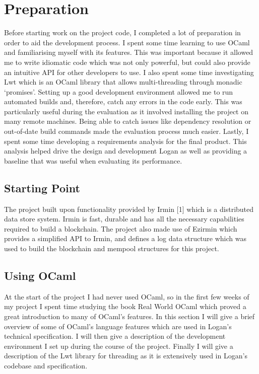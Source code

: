 \documentclass[12pt,a4paper,twoside,openright]{report}
\begin{document}
	\chapter{Preparation}
	Before starting work on the project code, I completed a lot of preparation in order to aid the development process.
	I spent some time learning to use OCaml and familiarising myself with its features.
	This was important because it allowed me to write idiomatic code which was not only powerful, but could also provide an intuitive API for other developers to use.
	I also spent some time investigating Lwt which is an OCaml library that allows multi-threading through monadic `promises'.
	Setting up a good development environment allowed me to run automated builds and, therefore, catch any errors in the code early.
	This was particularly useful during the evaluation as it involved installing the project on many remote machines.
	Being able to catch issues like dependency resolution or out-of-date build commands made the evaluation process much easier.
	Lastly, I spent some time developing a requirements analysis for the final product. 
	This analysis helped drive the design and development Logan as well as providing a baseline that was useful when evaluating its performance.

	\section{Starting Point}
	The project built upon functionality provided by Irmin [1] which is a distributed data store system. Irmin is fast, durable and has all the necessary capabilities required to build a blockchain.
	The project also made use of Ezirmin \cite{Ezirmin} which provides a simplified API to Irmin, and defines a log data structure which was used to build the blockchain and mempool structures for this project.

	\section{Using OCaml}
	At the start of the project I had never used OCaml, so in the first few weeks of my project I spent time studying the book Real World OCaml \cite{RealWorldOCaml} which proved a great introduction to many of OCaml's features.  
	In this section I will give a brief overview of some of OCaml's language features which are used in Logan's technical specification.
	I will then give a description of the development environment I set up during the course of the project.
	Finally I will give a description of the Lwt library for threading as it is extensively used in Logan's codebase and specification.
\end{document}
